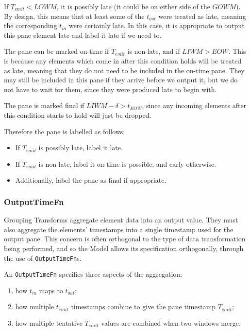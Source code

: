 If $T_{\mathit{emit}} < \mathit{LOWM}$, it is possibly late (it could be on either side of the $\mathit{GOWM}$).
By design, this means that at least some of the $t_{\mathit{out}}$ were treated as late, meaning the corresponding $t_{\mathit{in}}$ were certainly late.
In this case, it is appropriate to output this pane element late and label it late if we need to.

The pane can be marked on-time if $T_{\mathit{emit}}$ is non-late, and if $\mathit{LIWM} > EOW$.
This is because any elements which come in after this condition holds will be treated as late, meaning that they do not need to be included in the on-time pane.
They may still be included in this pane if they arrive before we output it, but we do not have to wait for them, since they were produced late to begin with.

The pane is marked final if $\mathit{LIWM} - \delta > t_{\mathit{EOW}}$, since any incoming elements after this condition starts to hold will just be dropped.

Therefore the pane is labelled as follows:
\begin{itemize}
	\item If $T_{\mathit{emit}}$ is possibly late, label it late.
	\item If $T_{\mathit{emit}}$ is non-late, label it on-time is possible, and early otherwise.
	\item Additionally, label the pane as final if appropriate.
\end{itemize}

\subsubsection{OutputTimeFn}
Grouping Transforms aggregate element data into an output value.
They must also aggregate the elements' timestamps into a single timestamp used for the output pane.
This concern is often orthogonal to the type of data transformation being performed, and so the Model allows its specification orthogonally, through the use of \verb|OutputTimeFn|s.

An \verb|OutputTimeFn| specifies three aspects of the aggregation:
\begin{enumerate}
	\item how $t_{\mathit{in}}$ maps to $t_{\mathit{out}}$;
	\item how multiple $t_{\mathit{emit}}$ timestamps combine to give the pane timestamp $T_{\mathit{emit}}$;
	\item how multiple tentative $T_{\mathit{emit}}$ values are combined when two windows merge.
\end{enumerate}

